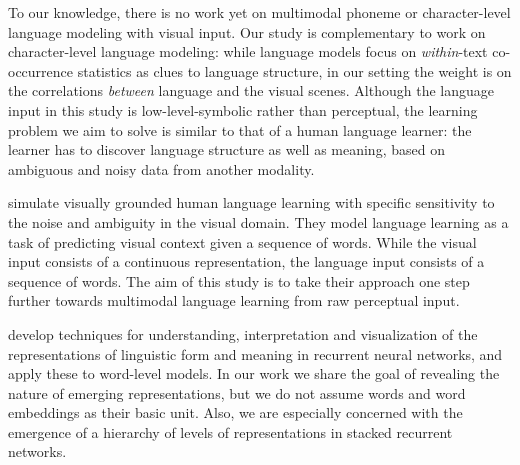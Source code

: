 To our knowledge, there is no work yet on multimodal phoneme or character-level language modeling with visual input. %
Our study is complementary to work on character-level language modeling: while language models focus on {\it within}-text co-occurrence statistics as clues to language structure, in our setting the weight is on the correlations  {\it between} language and the visual scenes. 
Although the language input in this study is low-level-symbolic rather than perceptual, the learning problem we aim to solve is similar to that of a human language learner: the learner has to discover language structure as well as meaning, based on ambiguous and noisy data from another modality. 

 simulate visually grounded human language learning with specific sensitivity to the noise and ambiguity in the visual domain. They model language learning as a task of predicting visual context given a sequence of words. While the visual input consists of a continuous representation, the language input consists of a sequence of words. The aim of this study is to take their approach one step further towards multimodal language learning from raw perceptual input. 

 develop techniques for understanding, interpretation and visualization of the representations of linguistic form and meaning in recurrent neural networks, and apply these to word-level models. In our work we share the goal of revealing the nature of emerging representations, but we do not assume words and word embeddings as their basic unit. Also, we are especially concerned with the emergence of a hierarchy of levels of representations in stacked recurrent networks.